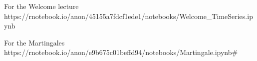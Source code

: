 For the Welcome lecture
https://rnotebook.io/anon/45155a7fdcf1ede1/notebooks/Welcome_TimeSeries.ipynb


For the Martingales
https://rnotebook.io/anon/e9b675c01beffd94/notebooks/Martingale.ipynb#
